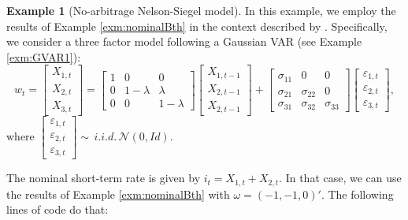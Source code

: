 \documentclass[
  12pt,
]{book}
\theoremstyle{definition}
\theoremstyle{definition}
\newtheorem{example}{Example}[chapter]
\theoremstyle{definition}
\theoremstyle{definition}
\theoremstyle{remark}
\begin{document}
\begin{example}[No-arbitrage Nelson-Siegel model]
\protect\hypertarget{exm:CDR2009}{}\label{exm:CDR2009}In this example, we employ the results of Example \ref{exm:nominalBth} in the context described by \citet{Christensen_Diebold_Rudebusch_2009}. Specifically, we consider a three factor model following a Gaussian VAR (see Example \ref{exm:GVAR1}):
\[
w_t = \left[\begin{array}{c}X_{1,t}\\X_{2,t}\\X_{3,t}\end{array}\right] = 
\left[\begin{array}{ccc}
1 & 0 & 0\\
0&1-\lambda&\lambda\\
0&0&1-\lambda\end{array}\right]
\left[\begin{array}{c}X_{1,t-1}\\X_{2,t-1}\\X_{2,t-1}\end{array}\right] +
\left[\begin{array}{ccc}
\sigma_{11} & 0 & 0\\
\sigma_{21}&\sigma_{22}&0\\
\sigma_{31}&\sigma_{32}&\sigma_{33}\end{array}\right]
\left[\begin{array}{c}\varepsilon_{1,t}\\\varepsilon_{2,t}\\\varepsilon_{3,t}\end{array}\right],
\]
where \(\left[\begin{array}{c}\varepsilon_{1,t}\\\varepsilon_{2,t}\\\varepsilon_{3,t}\end{array}\right] \sim \,i.i.d.\, \mathcal{N}(0,Id)\).

The nominal short-term rate is given by \(i_t = X_{1,t}+X_{2,t}\). In that case, we can use the results of Example \ref{exm:nominalBth} with \(\omega = (-1,-1,0)'\). The following lines of code do that:


\end{example}
\end{document}
